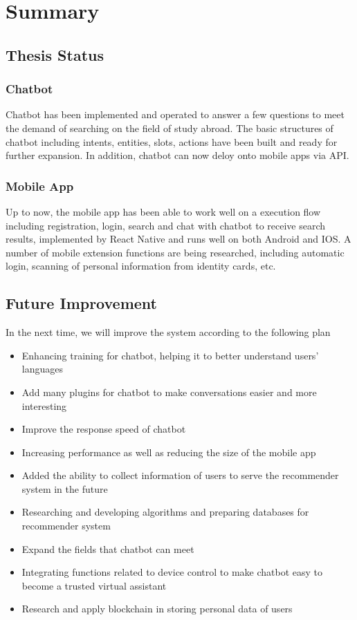 \chapter{Summary}
\section{Thesis Status}
\subsection{Chatbot}

Chatbot has been implemented and operated to answer a few questions to meet the demand of searching on the field of study abroad. The basic structures of chatbot including intents, entities, slots, actions have been built and ready for further expansion. In addition, chatbot can now deloy onto mobile apps via API.
\subsection{Mobile App}

Up to now, the mobile app has been able to work well on a execution flow including registration, login, search and chat with chatbot to receive search results, implemented by React Native and runs well on both Android and IOS. A number of mobile extension functions are being researched, including automatic login, scanning of personal information from identity cards, etc.
\section{Future Improvement}

In the next time, we will improve the system according to the following plan
\begin{itemize}
\item Enhancing training for chatbot, helping it to better understand users' languages
\item Add many plugins for chatbot to make conversations easier and more interesting
\item Improve the response speed of chatbot
\item Increasing performance as well as reducing the size of the mobile app
\item Added the ability to collect information of users to serve the recommender system in the future
\item Researching and developing algorithms and preparing databases for recommender system
\item Expand the fields that chatbot can meet
\item Integrating functions related to device control to make chatbot easy to become a trusted virtual assistant
\item Research and apply blockchain in storing personal data of users
\end{itemize}

